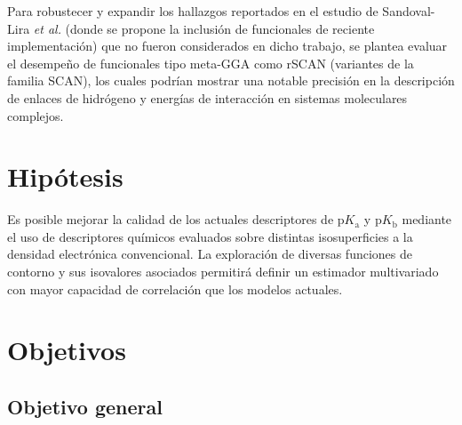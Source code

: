 \documentclass[12pt]{article}
\begin{document}
	Para robustecer y expandir los hallazgos reportados en el estudio  de Sandoval-Lira \textit{et al.} \cite{bib:sandovallira2020} (donde se propone la inclusi\'{o}n de funcionales de reciente implementaci\'{o}n) que no fueron considerados en dicho trabajo, se plantea evaluar el desempeño de funcionales tipo meta-GGA como rSCAN (variantes de la familia SCAN), los cuales podr\'{i}an mostrar una notable precisi\'{o}n en la descripci\'{o}n de enlaces de hidr\'{o}geno y energ\'{i}as de interacci\'{o}n en sistemas moleculares complejos. 
	
	
	
	\section{Hip\'{o}tesis}
	
	
	
	
	Es posible mejorar la calidad de los actuales descriptores de $\mathrm{p}K_{\mathrm{a}}$ y $\mathrm{p}K_{\mathrm{b}}$ mediante el uso de descriptores qu\'{i}micos evaluados sobre distintas isosuperficies a la densidad electr\'{o}nica convencional. La exploraci\'{o}n de diversas funciones de contorno y sus isovalores asociados permitir\'{a} definir un estimador multivariado con mayor capacidad de correlaci\'{o}n que los modelos actuales.
	
	\clearpage
	
	
	\section{Objetivos}
	\subsection{Objetivo general}
	
\end{document}
